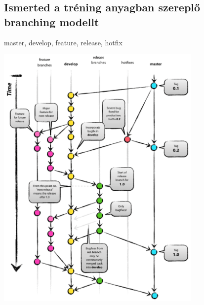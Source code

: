\documentclass[a4paper,14pt]{extarticle}
\begin{document}
		\subsection{Ismerted a tréning anyagban szereplő branching modellt}
			master, develop, feature, release, hotfix
			\newline
			\begin{center}
				\includegraphics[width=10cm]{gitbranching}
			\end{center}
\end{document}
